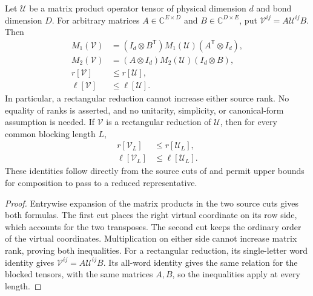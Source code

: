 \begin{lemma}
    \label{lem:mpu_rectangular_reduction_source_ranks}
    \leanok
    Let $\mathcal U$ be a matrix product operator tensor of physical
    dimension $d$ and bond dimension $D$. For arbitrary matrices
    $A\in\mathbb C^{E\times D}$ and $B\in\mathbb C^{D\times E}$, put
    $\mathcal V^{ij}=A\mathcal U^{ij}B$. Then
    \begin{align}
        M_1(\mathcal V)
                         & =(I_d\otimes B^{\mathsf T})M_1(\mathcal U)
        (A^{\mathsf T}\otimes I_d),                                      \\
        M_2(\mathcal V)
                         & =(A\otimes I_d)M_2(\mathcal U)(I_d\otimes B), \\
        r[\mathcal V]    & \leq r[\mathcal U],                           \\
        \ell[\mathcal V] & \leq\ell[\mathcal U].
    \end{align}
    In particular, a rectangular reduction cannot increase either source
    rank. No equality of ranks is asserted, and no unitarity, simplicity,
    or canonical-form assumption is needed.
    If $\mathcal V$ is a rectangular reduction of $\mathcal U$, then for
    every common blocking length $L$,
    \begin{align}
        r[\mathcal V_L]    & \leq r[\mathcal U_L],   \\
        \ell[\mathcal V_L] & \leq\ell[\mathcal U_L].
    \end{align}
    These identities follow directly from the source cuts of
    \cite[Section~III, definition of $r,\ell$]{Cirac2017MPU} and permit
    upper bounds for composition to pass to a reduced representative.
\end{lemma}

\begin{proof}\leanok
    Entrywise expansion of the matrix products in the two source cuts gives both formulas.
    The first cut places the right virtual coordinate on its row side,
    which accounts for the two transposes. The second cut keeps the
    ordinary order of the virtual coordinates. Multiplication on either
    side cannot increase matrix rank, proving both inequalities.
    For a rectangular reduction, its single-letter word identity gives
    $\mathcal V^{ij}=A\mathcal U^{ij}B$.
    Its all-word identity gives the same relation for the blocked tensors,
    with the same matrices $A,B$, so the inequalities apply at every length.
\end{proof}

